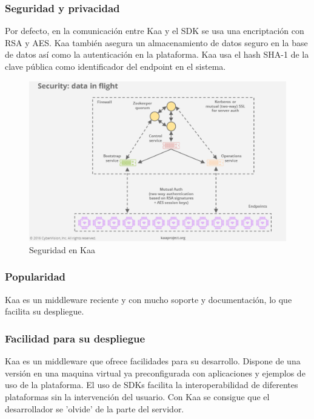 \documentclass[12pt, twoside]{book}
\begin{document}
\subsubsection*{Seguridad y privacidad}
Por defecto, en la comunicación entre Kaa y el SDK se usa una encriptación con RSA y AES. Kaa también asegura un almacenamiento de datos seguro en la base de datos así como la autenticación en la plataforma. Kaa usa el hash SHA-1 de la clave pública como identificador del endpoint en el sistema.
\begin{figure}[H]
\centering
\includegraphics[scale=0.5]{images/security_capture}
\caption{Seguridad en Kaa}\label{L510}
\end{figure} 
\subsubsection*{Popularidad}
Kaa es un middleware reciente y con mucho soporte y documentación, lo que facilita su despliegue.
\subsubsection*{Facilidad para su despliegue} 
Kaa es un middleware que ofrece facilidades para su desarrollo. Dispone de una versión en una maquina virtual ya preconfigurada con aplicaciones y ejemplos de uso de la plataforma. El uso de SDKs facilita la interoperabilidad de diferentes plataformas sin la intervención del usuario. Con Kaa se consigue que el desarrollador se 'olvide' de la parte del servidor. 
\end{document}
